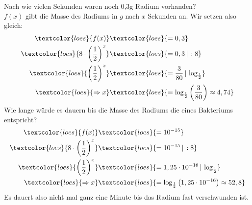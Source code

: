 \medskip

Nach wie vielen Sekunden waren noch 0,3g Radium vorhanden?\\
\textcolor{loes}{\(f(x)\) gibt die Masse des Radiums in \(g\) nach \(x\) Sekunden an. Wir setzen also gleich:}
\begin{align*}
	\textcolor{loes}{f(x)}&\textcolor{loes}{=0,3}\\
	\textcolor{loes}{8\cdot \left(\frac{1}{2}\right)^x}&\textcolor{loes}{=0,3\,\vert\,:8}\\
	\textcolor{loes}{\left(\frac{1}{2}\right)^x}&\textcolor{loes}{=\frac{3}{80}\,\vert\,\log_{\frac{1}{2}}}\\
	\textcolor{loes}{\Rightarrow x}&\textcolor{loes}{=\log_{\frac{1}{2}}\left(\frac{3}{80}\right) \approx 4,74}
\end{align*}
Wie lange würde es dauern bis die Masse des Radiums die eines Bakteriums entspricht?
\begin{align*}
	\textcolor{loes}{f(x)}&\textcolor{loes}{=10^{-15}}\\
	\textcolor{loes}{8\cdot \left(\frac{1}{2}\right)^x}&\textcolor{loes}{=10^{-15}\,\vert\,:8}\\
	\textcolor{loes}{\left(\frac{1}{2}\right)^x}&\textcolor{loes}{=1,25\cdot 10^{-16}\,\vert\,\log_{\frac{1}{2}}}\\
	\textcolor{loes}{\Rightarrow x}&\textcolor{loes}{=\log_{\frac{1}{2}}\left(1,25\cdot 10^{-16}\right) \approx 52,8}
\end{align*}
\textcolor{loes}{Es dauert also nicht mal ganz eine Minute bis das Radium fast verschwunden ist.}